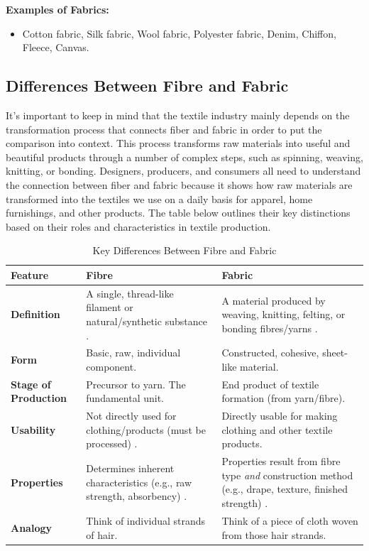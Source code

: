 \textbf{Examples of Fabrics:}
\begin{itemize}
    \item Cotton fabric, Silk fabric, Wool fabric, Polyester fabric, Denim, Chiffon, Fleece, Canvas.
\end{itemize}

\subsection{Differences Between Fibre and Fabric}

It's important to keep in mind that the textile industry mainly depends on the transformation process that connects fiber and fabric in order to put the comparison into context. This process transforms raw materials into useful and beautiful products through a number of complex steps, such as spinning, weaving, knitting, or bonding. Designers, producers, and consumers all need to understand the connection between fiber and fabric because it shows how raw materials are transformed into the textiles we use on a daily basis for apparel, home furnishings, and other products. The table below outlines their key distinctions based on their roles and characteristics in textile production.

\newpage

\begin{table}[h!]
    \centering
    \caption{Key Differences Between Fibre and Fabric}
    \label{tab:fibre_fabric_diff}
    \begin{tabular}{l p{5cm} p{5cm}} %
        \toprule
        \textbf{Feature} & \textbf{Fibre} & \textbf{Fabric} \\
        \midrule
        \textbf{Definition} & A single, thread-like filament or natural/synthetic substance \cite{researchgate}. & A material produced by weaving, knitting, felting, or bonding fibres/yarns \cite{researchgate, hong2024research}. \\
        \textbf{Form} & Basic, raw, individual component. & Constructed, cohesive, sheet-like material. \\
        \textbf{Stage of Production} & Precursor to yarn. The fundamental unit. & End product of textile formation (from yarn/fibre). \\
        \textbf{Usability} & Not directly used for clothing/products (must be processed) \cite{researchgate}. & Directly usable for making clothing and other textile products. \\
        \textbf{Properties} & Determines inherent characteristics (e.g., raw strength, absorbency) \cite{researchgate}. & Properties result from fibre type \textit{and} construction method (e.g., drape, texture, finished strength) \cite{researchgate, hong2024research}. \\
        \textbf{Analogy} & Think of individual strands of hair. & Think of a piece of cloth woven from those hair strands. \\
        \bottomrule
    \end{tabular}
\end{table}

